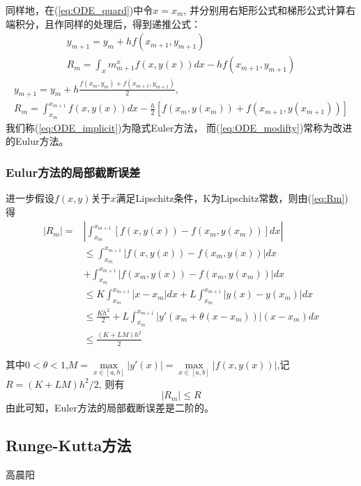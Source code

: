 同样地，在(\ref{eq:ODE_quard})中令$x = x_m$, 并分别用右矩形公式和梯形公式计算右端积分，且作同样的处理后，得到递推公式：
\begin{equation}\label{eq:ODE_implicit}
		\begin{aligned}
				y_{m+1}=y_m + h f(x_{m+1} , y_{m+1})\\
		        R_m = \int_xm^x_{m+1} f(x,y(x)) dx - h f(x_{m+1}, y_{m+1})
        \end{aligned}
\end{equation}
\begin{equation}\label{eq:ODE_modifty}
		\begin{aligned}
				y_{m+1}= y_m + h \frac{f(x_m,y_m) + f(x_{m+1},y_{m+1})}{2},\\
				R_m = \int_{x_m}^{x_{m+1}} f(x,y(x))dx- \frac{h}{2}[f(x_m,y(x_m))+ f(x_{m+1},y(x_{m+1}))]
		\end{aligned}
\end{equation}
我们称(\ref{eq:ODE_implicit})为隐式Euler方法， 而(\ref{eq:ODE_modifty})常称为改进的Eulur方法。
\subsubsection{Eulur方法的局部截断误差}
进一步假设$f(x,y)$关于$x$满足Lipschitz条件，K为Lipschitz常数，则由(\ref{eq:Rm})得
\begin{equation*}
		\begin{aligned}
				|R_m|= & | \int_{x_m}^{x_{m+1}} [f(x,y(x)) - f(x_m,y(x_m))] dx|\\
				&\leq \int_{x_m}^{x_{m+1}}|f(x,y(x)) - f(x_m, y(x))| dx\\
				&+\int_{x_m}^{x_{m+1}}|f(x_m,y(x)) - f(x_m, y(x_m))| dx\\
				&\leq K \int_{x_m}^{x_{m+1}}|x-x_m|dx + L\int_{x_m}^{x_{m+1}}|y(x)-y(x_m)|dx\\
				&\leq \frac{Kh^2}{2}+ L\int_{x_m}^{x_{m+1}}|y'(x_m+\theta (x-x_m))|(x-x_m)dx\\
				&\leq \frac{(K+LM)h^2}{2}
		\end{aligned}
\end{equation*}

其中$0 <\theta < 1$,$ M = \max\limits_{x \in [a,b]}|y'(x)| = \max\limits_{x\in[a,b]}|f(x,y(x))|$,记$R= (K+LM)h^2/2$, 则有
$$ |R_m| \leq R $$
由此可知，Euler方法的局部截断误差是二阶的。

\subsection{Runge-Kutta方法}
{\color{red}\begin{center}
     高晨阳
\end{center}}
